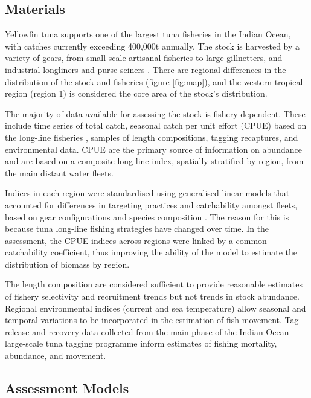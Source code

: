 \documentclass[12pt,halfline,a4paper,nonumbib]{ouparticle}
\begin{document}
\subsection{Materials}

Yellowfin tuna supports one of the largest tuna fisheries in the Indian Ocean, with catches currently exceeding 400,000t annually. The stock is harvested by a variety of gears, from small-scale artisanal fisheries to large gillnetters, and industrial longliners and purse seiners \parencite{fiorellato2019tt}.
There are regional differences in the distribution of the stock and fisheries (figure \ref{fig:map}), and the  western tropical region (region 1) is considered the core area of the stock's distribution.

The majority of data available for assessing the stock is fishery dependent. These include time series of total catch, seasonal catch per unit effort (CPUE) based on the long-line fisheries \parencite{hoyle2020scaling}, samples of length compositions, tagging recaptures, and environmental data. CPUE are the primary source of information on abundance and are based on a composite long-line index,  spatially stratified by region, from the main distant water fleets. %

Indices in each region were standardised using generalised linear models that accounted for differences in targeting practices and catchability amongst fleets, based on gear configurations and species composition \parencite{hoyle2020scaling}. The reason for this is because tuna long-line fishing strategies have changed over time. %
In the assessment, the CPUE indices across regions were linked by a common catchability coefficient, thus improving the ability of the model to estimate the distribution of biomass by region. %

The length composition are considered sufficient to provide reasonable estimates of fishery selectivity and recruitment trends but not trends in stock abundance. Regional environmental indices (current and sea temperature) allow seasonal and temporal variations to be incorporated in the estimation of fish movement. Tag release and recovery data collected from the main phase of the Indian Ocean large-scale tuna tagging programme %
inform estimates of fishing mortality, abundance, and movement. 


\subsection{Assessment Models}
\end{document}
